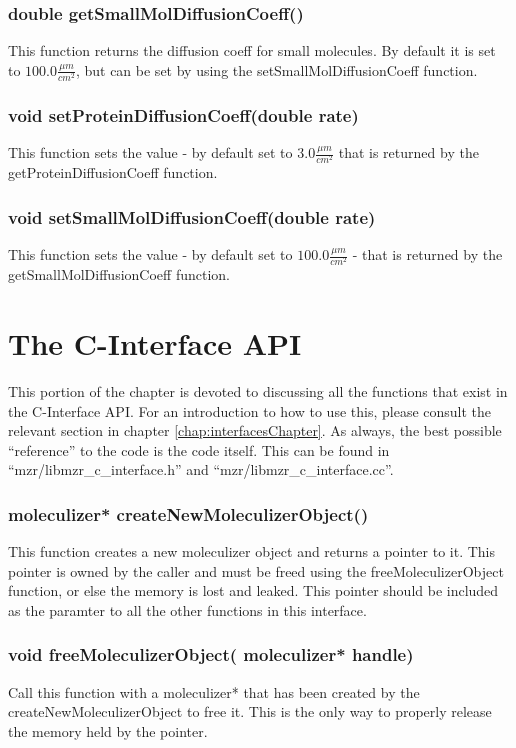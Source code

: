 \subsubsection{double getSmallMolDiffusionCoeff()}
This function returns the diffusion coeff for small molecules.  By default it
is set to $100.0\frac{\mu m}{cm^2}$, but can be set by using the
setSmallMolDiffusionCoeff function.

\subsubsection{void setProteinDiffusionCoeff(double rate)}
This function sets the value - by default set to $3.0\frac{\mu
  m}{cm^2}$ that is returned by the getProteinDiffusionCoeff function.

\subsubsection{void setSmallMolDiffusionCoeff(double rate)}

This function sets the value - by default set to $100.0\frac{\mu
  m}{cm^2}$ - that is returned by the getSmallMolDiffusionCoeff function.

\section{The C-Interface API}
This portion of the chapter is devoted to discussing all the functions
that exist in the C-Interface API.  For an introduction to how to use
this, please consult the relevant section in chapter
\ref{chap:interfacesChapter}.  As always, the best possible
``reference'' to the code is the code itself.  This can be found in
``mzr/libmzr\_c\_interface.h'' and ``mzr/libmzr\_c\_interface.cc''.

\subsubsection{moleculizer* createNewMoleculizerObject()}
This function creates a new moleculizer object and returns a pointer
to it.  This pointer is owned by the caller and must be freed using
the freeMoleculizerObject function, or else the memory is lost and
leaked.  This pointer should be included as the paramter to all the
other functions in this interface.    

\subsubsection{void freeMoleculizerObject( moleculizer* handle)}
Call this function with a moleculizer* that has been created by the
createNewMoleculizerObject to free it.  This is the only way to
properly release the memory held by the pointer.

